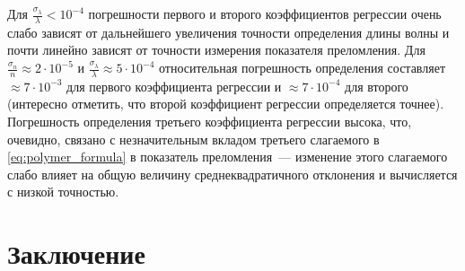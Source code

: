\documentclass[11pt,a4paper]{article}
\theoremstyle{definition}
\begin{document}
Для $\frac{\sigma_{\lambda}}{\lambda} < 10^{-4}$ погрешности первого и второго коэффициентов
регрессии очень слабо зависят от дальнейшего увеличения точности
определения длины волны и почти линейно зависят от точности измерения
показателя преломления. Для $\frac{\sigma_n}{n} \approx 2 \cdot 10^{-5}$
и $\frac{\sigma_{\lambda}}{\lambda} \approx 5 \cdot 10^{-4}$ относительная
погрешность определения составляет $\approx 7 \cdot 10^{-3}$ для первого коэффициента
регрессии и $\approx 7 \cdot 10^{-4}$ для второго (интересно отметить, что второй
коэффициент регрессии определяется точнее). Погрешность определения
третьего коэффициента регрессии высока, что, очевидно, связано с
незначительным вкладом третьего слагаемого в \eqref{eq:polymer_formula} в показатель преломления~---
изменение этого слагаемого слабо влияет на общую величину
среднеквадратичного отклонения и вычисляется с низкой точностью.

\section{Заключение}
\end{document}
